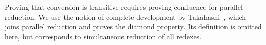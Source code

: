 \documentclass[a4paper,UKenglish,cleveref,autoref,thm-restate]{lipics-v2021}
\newcommand{\citep}[1]{\cite{#1}}
\newcommand{\repo}{https://github.com/ionathanch/TTBFL}
\newcommand{\thmref}[2]{%
  $\langle$\href{\repo/tree/main/src/#1}{\texttt{#1}}\texttt{:#2}$\rangle$%
}
\begin{document}
\iffalse
\begin{figure}
\begin{alignat*}{3}
  \hspace{-1.5em}
  &
  \begin{aligned}
      (  \Pi  \ottmv{x}  \mathbin{:}  \ottnt{A}  \mathpunct{.}  \ottnt{B}  )  ^{ \mathsf{T} }  &\triangleq  \Pi  \ottmv{x}  \mathbin{:}   \ottnt{A} ^{ \mathsf{T} }   \mathpunct{.}   \ottnt{B} ^{ \mathsf{T} }   \\
      (  \lambda  \ottmv{x}  \mathbin{:}  \ottnt{A}  \mathpunct{.}  \ottnt{b}  )  ^{ \mathsf{T} }  &\triangleq  \lambda  \ottmv{x}  \mathbin{:}   \ottnt{A} ^{ \mathsf{T} }   \mathpunct{.}   \ottnt{b} ^{ \mathsf{T} }   \\
      (  \kw{absurd}_{ \ottnt{A} } \gap  \ottnt{b}  )  ^{ \mathsf{T} }  &\triangleq   \kw{absurd}_{  \ottnt{A} ^{ \mathsf{T} }  } \gap  \ottnt{b}  ^{ \mathsf{T} } 
  \end{aligned}
  & ~ &
  \begin{aligned}
      (  \kw{U} \gap  \ottnt{k}  )  ^{ \mathsf{T} }  &\triangleq  \kw{U} \gap   \ottnt{k} ^{ \mathsf{T} }   \\
      (  \kw{Level}\texttt{<} \gap  \ell  )  ^{ \mathsf{T} }  &\triangleq  \kw{Level}\texttt{<} \gap   \ell ^{ \mathsf{T} }   \\
     \ottnt{a} ^{ \mathsf{T} }  &\triangleq a ~ \textit{otherwise}
  \end{aligned}
  & ~ &
  \begin{aligned}
      (  \ottnt{b}  \gap  \ottnt{a}  )  ^{ \mathsf{T} }  &\triangleq
    \begin{cases}
        \ottnt{b'} ^{ \mathsf{T} }  [  \ottmv{x}  \mapsto   \ottnt{a} ^{ \mathsf{T} }   ]  &\textit{if } \ottnt{b} \textit{ is }  \lambda  \ottmv{x}  \mathpunct{.}  \ottnt{b'}  \\
         \ottnt{b} ^{ \mathsf{T} }   \gap  \ottnt{a}  ^{ \mathsf{T} }  &\textit{otherwise}
    \end{cases} \\
    &
  \end{aligned}
\end{alignat*}
\caption{Complete development \thmref{reduction.lean}{taka}}
\label{fig:taka}
\end{figure}
\fi

Proving that conversion is transitive requires proving confluence for parallel reduction.
We use the notion of complete development  by Takahashi~\citep{takahashi},
which joins parallel reduction and proves the diamond property.
Its definition is omitted here,
but corresponds to simultaneous reduction of all redexes.
\end{document}
